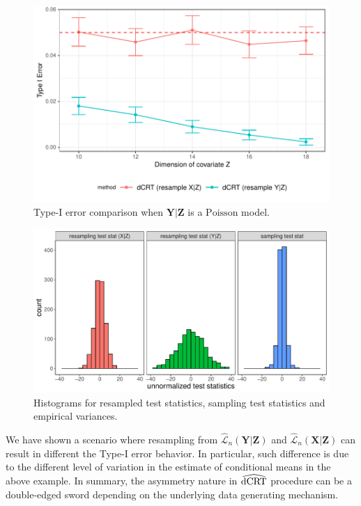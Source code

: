 \documentclass[aos]{imsart}
\theoremstyle{plain}
\theoremstyle{remark}
\newcommand{\prx}{\bm X}								%
\newcommand{\prz}{\bm Z}								%
\newcommand{\pry}{{\bm Y}}								%
\newcommand{\lawhat}{\widehat{\mathcal L}}				%
\newcommand{\dCRThat}{\widehat{\textnormal{dCRT}}}		%
\begin{document}
	\begin{figure}[ht]
		\centering
		\includegraphics[width=\linewidth]{Figures/varying-dimension-gaussian-poisson-200-10-18-double-poisson.pdf}
		\caption{Type-I error comparison when $\bm Y|\bm Z$ is a $\mathrm{Poisson}$ model.}
		\label{fig:dCRT_GCM_double_poisson_type_I_err} 
	\end{figure}

	\begin{figure}[ht]
		\centering
			\includegraphics[width=\linewidth]{Figures/histograms_unnormalized.pdf}
		\caption{Histograms for resampled test statistics, sampling test statistics and empirical variances.}
		\label{fig:dCRT_GCM_double_poisson_histogram} 
	\end{figure}
	We have shown a scenario where resampling from $\lawhat_n(\pry|\prz)$ and $\lawhat_n(\prx|\prz)$ can result in different the Type-I error behavior. In particular, such difference is due to the different level of variation in the estimate of conditional means in the above example. In summary, the asymmetry nature in $\dCRThat$ procedure can be a double-edged sword depending on the underlying data generating mechanism. 
\end{document}
